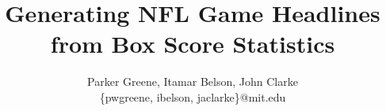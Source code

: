 \documentclass[journal]{IEEEtran}
\begin{document}
%
\title{Generating NFL Game Headlines from Box Score Statistics}

%
%
%

\author{Parker Greene, Itamar Belson, John Clarke\\\{pwgreene, ibelson, jaclarke\}@mit.edu\\}

% 
%



% 
\end{document}
